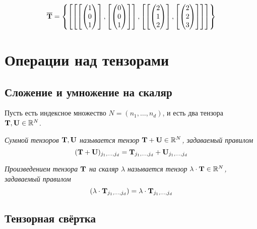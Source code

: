 \documentclass[a4paper, 12pt]{article}
\begin{document}
\begin{example}
        \[
            \overline{\mathbf{T}} =
            \left\{
                \left[
                    \left[
                        \left[
                            \begin{pmatrix}
                                1\\0\\1
                            \end{pmatrix}
                            \right],
                        \left[
                            \begin{pmatrix}
                                0\\0\\1
                            \end{pmatrix}
                            \right]
                        \right],
                    \left[
                        \left[
                            \begin{pmatrix}
                                2\\1\\2
                            \end{pmatrix}
                            \right],
                        \left[
                            \begin{pmatrix}
                                2\\2\\3
                            \end{pmatrix}
                            \right]
                        \right]
                    \right]
                \right\}
        \]
    \end{example}
    \section{Операции над тензорами}
    \subsection{Сложение и умножение на скаляр}
    Пусть есть индексное множество $N = (n_1, \ldots, n_d)$, и есть два тензора $\mathbf{T}, \mathbf{U} \in \mathbb{R}^N$.
    \begin{definition}
        \it{Суммой тензоров $\mathbf{T}, \mathbf{U}$} называется тензор $\mathbf{T} + \mathbf{U} \in \mathbb{R}^N$, задаваемый правилом
        \[
            (\mathbf{T} + \mathbf{U})_{j_1, \ldots, j_d} = \mathbf{T}_{j_1, \ldots, j_d} + \mathbf{U}_{j_1, \ldots, j_d}
        \]
    \end{definition}
    \begin{definition}
        \it{Произведением тензора $\mathbf{T}$ на скаляр $\lambda$} называется тензор $\lambda \cdot \mathbf{T} \in \mathbb{R}^N$, задаваемый правилом
        \[
            (\lambda \cdot \mathbf{T}_{j_1, \ldots, j_d}) = \lambda \cdot \mathbf{T}_{j_1, \ldots, j_d}
        \]
    \end{definition}
    \begin{comment}
        Несложно показать, что множество $\RR^N$ с такими опреациями сложения и умножения является векторным пространством над полем $\RR$.
    \end{comment}
    \subsection{Тензорная свёртка}
    
\end{document}
